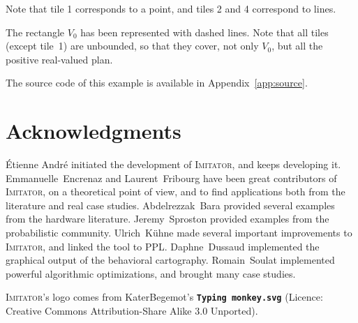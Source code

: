 \documentclass[a4paper,11pt]{article}
\newcommand{\imitator}{\textsc{Imitator}}
\newcommand{\code}[1]{\textbf{\texttt{#1}}}
\begin{document}
Note that tile 1 corresponds to a point, and tiles 2 and 4 correspond to lines.

The rectangle $V_0$ has been represented with dashed lines.
Note that all tiles (except tile~1) are unbounded, so that they cover, not only $V_0$, but all the positive real-valued plan.


The source code of this example is available in Appendix~\ref{app:source}.



\newpage
\section*{Acknowledgments}

\'Etienne André initiated the development of \imitator{}, and keeps developing it.
Emmanuelle~Encrenaz and Laurent~Fribourg have been great contributors of \imitator{}, on a theoretical point of view, and to find applications both from the literature and real case studies.
Abdelrezzak~Bara provided several examples from the hardware literature.
Jeremy~Sproston provided examples from the probabilistic community.
Ulrich~K\"uhne made several important improvements to \imitator{}, and linked the tool to PPL.
Daphne~Dussaud implemented the graphical output of the behavioral cartography.
Romain~Soulat implemented powerful algorithmic optimizations, and brought many case studies.

\imitator{}'s logo comes from KaterBegemot's \code{Typing monkey.svg} (Licence: Creative Commons Attribution-Share Alike 3.0 Unported).


\newpage



\newpage
\end{document}
